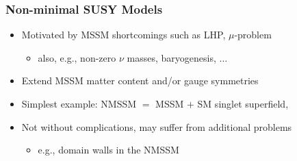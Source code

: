 \documentclass[10pt,aspectratio=169]{beamer}
\begin{document}
\begin{frame}
  \frametitle{Non-minimal SUSY Models}
  \begin{itemize} \itemsep1em
    \item Motivated by MSSM shortcomings such as LHP, $\mu$-problem
      \begin{itemize}
        \item also, e.g., non-zero $\nu$ masses, baryogenesis, $\ldots$
      \end{itemize}
    \item Extend MSSM matter content and/or gauge symmetries
    \item Simplest example: NMSSM $=$ MSSM $+$ SM singlet superfield,
      \vspace{5pt}
      \begin{figure}
        \centering
      \end{figure}
    \item Not without complications, may suffer from additional problems
      \begin{itemize}
        \item e.g., domain walls in the NMSSM
      \end{itemize}
  \end{itemize}
\end{frame}
\end{document}

